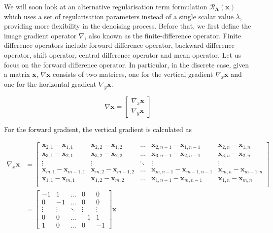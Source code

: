 \documentclass[12pt]{article}
\begin{document}
We will soon look at an alternative regularisation term formulation $\mathcal{R}_{\mathbf{\Lambda}}(\mathbf{x})$ which uses a set of regularisation parameters instead of a single scalar value $\lambda$, providing more flexibility in the denoising process. Before that, we first define the image gradient operator $\nabla$, also known as the finite-difference operator.
Finite difference operators include forward difference operator,
backward difference operator, shift operator, central difference operator and mean operator.
Let us focus on the forward difference operator. In particular, in the discrete case, given a matrix $\mathbf{x}$, $\nabla \mathbf{x}$ consists of two matrices, one for the vertical gradient $\nabla_{x} \mathbf{x}$ and one for the horizontal gradient $\nabla_{y} \mathbf{x}$.


\begin{equation}
  \nabla \mathbf{x} = \begin{bmatrix}
    \nabla_{x} \mathbf{x} \\
    \nabla_{y} \mathbf{x}
  \end{bmatrix}
\end{equation}



For the forward gradient, the vertical gradient is calculated as

\begin{equation}
  \begin{aligned}
  \nabla_{x} \mathbf{x} &= \begin{bmatrix}
    \mathbf{x}_{2,1} - \mathbf{x}_{1,1} & \mathbf{x}_{2, 2} - \mathbf{x}_{1, 2} & \ldots & \mathbf{x}_{2, n-1} - \mathbf{x}_{1, n-1} & \mathbf{x}_{2, n} - \mathbf{x}_{1, n} \\
    \mathbf{x}_{3,1} - \mathbf{x}_{2,1} & \mathbf{x}_{3, 2} - \mathbf{x}_{2, 2} & \ldots & \mathbf{x}_{3, n-1} - \mathbf{x}_{2, n-1} & \mathbf{x}_{3, n} - \mathbf{x}_{2, n}  \\
    \vdots & \vdots & \ddots & \vdots & \vdots \\
    \mathbf{x}_{m,1} - \mathbf{x}_{m-1,1} & \mathbf{x}_{m, 2} - \mathbf{x}_{m-1, 2} & \ldots & \mathbf{x}_{m, n-1} - \mathbf{x}_{m-1, n-1} & \mathbf{x}_{m, n} - \mathbf{x}_{m-1, n} \\
    \mathbf{x}_{1, 1} - \mathbf{x}_{m, 1} & \mathbf{x}_{1, 2} - \mathbf{x}_{m, 2} & \ldots & \mathbf{x}_{1, n-1} - \mathbf{x}_{m, n-1} & \mathbf{x}_{1, n} - \mathbf{x}_{m, n} \\
  \end{bmatrix} \\
  &= \begin{bmatrix}
    -1 & 1 & \ldots & 0 & 0 \\
    0 & -1 & \ldots & 0 & 0 \\
     \vdots & \vdots & \ddots & \vdots & \vdots \\
    0 & 0 & \ldots & -1 & 1 \\
    1 & 0 & \ldots & 0 & -1
    \end{bmatrix} \mathbf{x}
  \end{aligned}
\end{equation}
\end{document}
